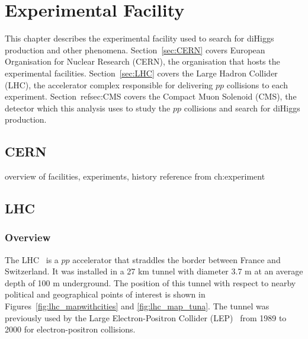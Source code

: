 
\chapter{Experimental Facility\label{ch:experiment}}

This chapter describes the experimental facility used to search for diHiggs production and other phenomena. Section~\ref{sec:CERN} covers European Organisation for Nuclear Research (CERN), the organisation
that hosts the experimental facilities. Section~\ref{sec:LHC} covers the Large Hadron Collider (LHC), the accelerator complex responsible for delivering $pp$ collisions to each experiment. Section~ref{sec:CMS}
covers the Compact Muon Solenoid (CMS), the detector which this analysis uses to study the $pp$ collisions and search for diHiggs production.


\section{CERN\label{sec:CERN}}
overview of facilities, experiments, history
reference from ch:experiment

\section{LHC\label{sec:LHC}}
\subsection{Overview}
The LHC~\cite{cern-jinst-lhc} is a $pp$ accelerator that straddles the border between France and Switzerland. It was installed in a 27 km tunnel with diameter 3.7 m at an average depth of 100 m underground.
The position of this tunnel with respect to nearby political and geographical points of interest is 
shown in Figures~\ref{fig:lhc_mapwithcities} and \ref{fig:lhc_map_tuna}.
The tunnel was previously
used by the Large Electron-Positron Collider (LEP)~\cite{LEP_DR1979} from 1989 to 2000 for electron-positron collisions.

